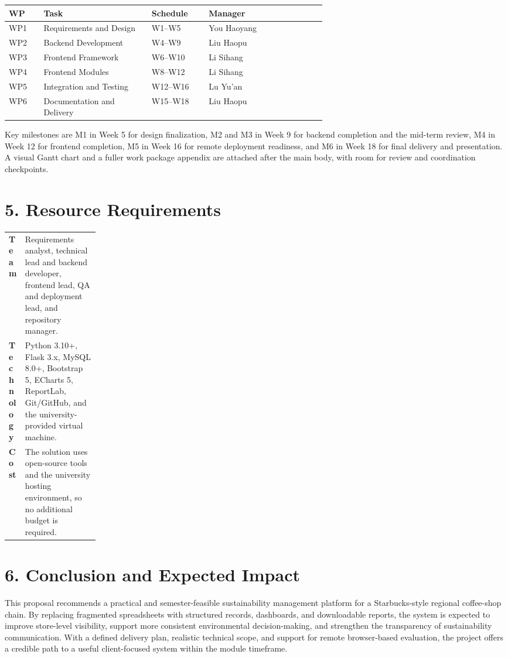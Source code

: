 \documentclass[10pt,a4paper]{article}
\begin{document}
\begin{tabularx}{\linewidth}{@{}p{0.11\linewidth}p{0.34\linewidth}p{0.18\linewidth}X@{}}
\toprule
\textbf{WP} & \textbf{Task} & \textbf{Schedule} & \textbf{Manager} \\
\midrule
WP1 & Requirements and Design & W1--W5 & You Haoyang \\
WP2 & Backend Development & W4--W9 & Liu Haopu \\
WP3 & Frontend Framework & W6--W10 & Li Sihang \\
WP4 & Frontend Modules & W8--W12 & Li Sihang \\
WP5 & Integration and Testing & W12--W16 & Lu Yu'an \\
WP6 & Documentation and Delivery & W15--W18 & Liu Haopu \\
\bottomrule
\end{tabularx}

Key milestones are M1 in Week 5 for design finalization, M2 and M3 in Week 9 for backend completion and the mid-term review, M4 in Week 12 for frontend completion, M5 in Week 16 for remote deployment readiness, and M6 in Week 18 for final delivery and presentation. A visual Gantt chart and a fuller work package appendix are attached after the main body, with room for review and coordination checkpoints.

\section*{5. Resource Requirements}
\begin{tabularx}{\linewidth}{@{}>{\bfseries}p{0.18\linewidth}X@{}}
Team & Requirements analyst, technical lead and backend developer, frontend lead, QA and deployment lead, and repository manager. \\
Technology & Python 3.10+, Flask 3.x, MySQL 8.0+, Bootstrap 5, ECharts 5, ReportLab, Git/GitHub, and the university-provided virtual machine. \\
Cost & The solution uses open-source tools and the university hosting environment, so no additional budget is required. \\
\end{tabularx}

\section*{6. Conclusion and Expected Impact}
This proposal recommends a practical and semester-feasible sustainability management platform for a Starbucks-style regional coffee-shop chain. By replacing fragmented spreadsheets with structured records, dashboards, and downloadable reports, the system is expected to improve store-level visibility, support more consistent environmental decision-making, and strengthen the transparency of sustainability communication. With a defined delivery plan, realistic technical scope, and support for remote browser-based evaluation, the project offers a credible path to a useful client-focused system within the module timeframe.
\end{document}
